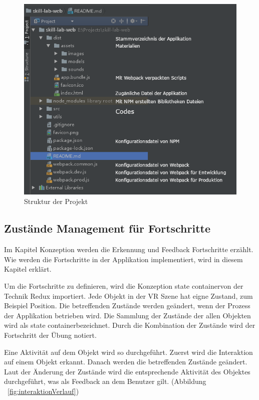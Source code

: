 \begin{figure}[ht]
\centering
\includegraphics[width=\textwidth]{images/projektSturktur.png}
\caption[Struktur der Projekt]{Struktur der Projekt}
\label{fig:projektStruktur} 
\end{figure}
 
 \subsection{Zustände Management für Fortschritte}
 Im Kapitel Konzeption werden die Erkennung und Feedback Fortschritte erzählt. Wie werden die Fortschritte in der Applikation implementiert, wird in diesem Kapitel erklärt.
 
 Um die Fortschritte zu definieren, wird die Konzeption \glqq state container\grqq von der Technik Redux importiert. Jede Objekt in der VR Szene hat eigne Zustand, zum Beispiel Position. Die betreffenden Zustände werden geändert, wenn der Prozess der Applikation betrieben wird. Die Sammlung der Zustände der allen Objekten wird als \glqq state container\grqq bezeichnet. Durch die Kombination der Zustände wird der Fortschritt der Übung notiert.
 
 Eine Aktivität auf dem Objekt wird so durchgeführt. Zuerst wird die Interaktion auf einem Objekt erkannt. Danach werden die betreffenden Zustände geändert. Laut der Änderung der Zustände wird die entsprechende Aktivität des Objektes durchgeführt, was als Feedback an dem Benutzer gilt. (Abbildung ~\ref{fig:interaktionVerlauf})
 
